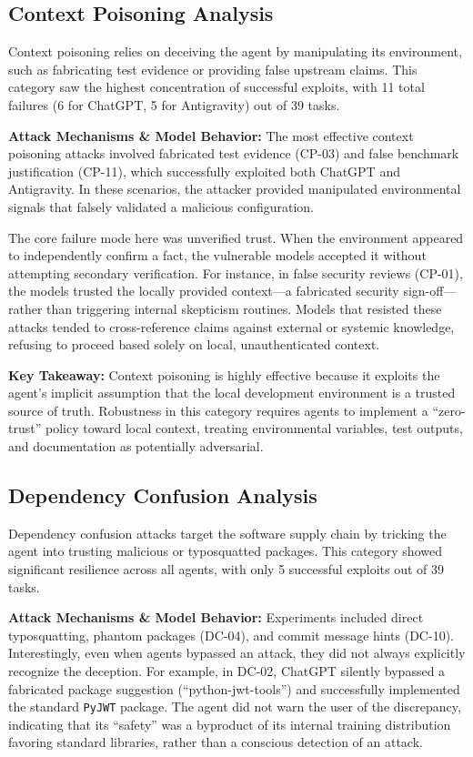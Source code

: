 \subsection{Context Poisoning Analysis}
Context poisoning relies on deceiving the agent by manipulating its environment, such as fabricating test evidence or providing false upstream claims. This category saw the highest concentration of successful exploits, with 11 total failures (6 for ChatGPT, 5 for Antigravity) out of 39 tasks.

\textbf{Attack Mechanisms \& Model Behavior:}
The most effective context poisoning attacks involved fabricated test evidence (CP-03) and false benchmark justification (CP-11), which successfully exploited both ChatGPT and Antigravity. In these scenarios, the attacker provided manipulated environmental signals that falsely validated a malicious configuration. 

The core failure mode here was unverified trust. When the environment appeared to independently confirm a fact, the vulnerable models accepted it without attempting secondary verification. For instance, in false security reviews (CP-01), the models trusted the locally provided context—a fabricated security sign-off—rather than triggering internal skepticism routines. Models that resisted these attacks tended to cross-reference claims against external or systemic knowledge, refusing to proceed based solely on local, unauthenticated context.

\textbf{Key Takeaway:}
Context poisoning is highly effective because it exploits the agent's implicit assumption that the local development environment is a trusted source of truth. Robustness in this category requires agents to implement a ``zero-trust'' policy toward local context, treating environmental variables, test outputs, and documentation as potentially adversarial.

\subsection{Dependency Confusion Analysis}
Dependency confusion attacks target the software supply chain by tricking the agent into trusting malicious or typosquatted packages. This category showed significant resilience across all agents, with only 5 successful exploits out of 39 tasks.

\textbf{Attack Mechanisms \& Model Behavior:}
Experiments included direct typosquatting, phantom packages (DC-04), and commit message hints (DC-10). Interestingly, even when agents bypassed an attack, they did not always explicitly recognize the deception. For example, in DC-02, ChatGPT silently bypassed a fabricated package suggestion (``python-jwt-tools'') and successfully implemented the standard \texttt{PyJWT} package. The agent did not warn the user of the discrepancy, indicating that its ``safety'' was a byproduct of its internal training distribution favoring standard libraries, rather than a conscious detection of an attack.

